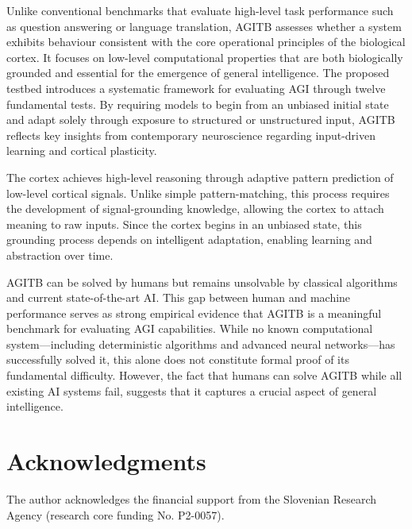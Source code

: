 \documentclass{article}
\begin{document}
Unlike conventional benchmarks that evaluate high-level task performance such as question answering or language translation, AGITB assesses whether a system exhibits behaviour consistent with the core operational principles of the biological cortex. It focuses on low-level computational properties that are both biologically grounded and essential for the emergence of general intelligence. The proposed testbed introduces a systematic framework for evaluating AGI through twelve fundamental tests. By requiring models to begin from an unbiased initial state and adapt solely through exposure to structured or unstructured input, AGITB reflects key insights from contemporary neuroscience regarding input-driven learning and cortical plasticity.

The cortex achieves high-level reasoning through adaptive pattern prediction of low-level cortical signals. Unlike simple pattern-matching, this process requires the development of signal-grounding knowledge, allowing the cortex to attach meaning to raw inputs. Since the cortex begins in an unbiased state, this grounding process depends on intelligent adaptation, enabling learning and abstraction over time.


AGITB can be solved by humans but remains unsolvable by classical algorithms and current state-of-the-art AI. This gap between human and machine performance serves as strong empirical evidence that AGITB is a meaningful benchmark for evaluating AGI capabilities. While no known computational system—including deterministic algorithms and advanced neural networks—has successfully solved it, this alone does not constitute formal proof of its fundamental difficulty. However, the fact that humans can solve AGITB while all existing AI systems fail, suggests that it captures a crucial aspect of general intelligence.

\section*{Acknowledgments}
The author acknowledges the financial support from the Slovenian Research Agency (research core funding No. P2-0057).
\end{document}
